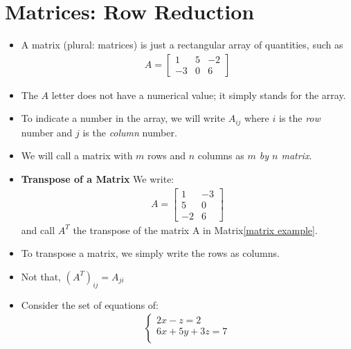         \section{Matrices: Row Reduction}
            \begin{itemize}
                \item A matrix (plural: matrices) is just a rectangular array of quantities, such as
                \begin{align} \label{matrix example}
                    A= \begin{bmatrix} 
                        1 & 5 & -2 \\
                        -3 & 0 & 6 
                    \end{bmatrix}
                \end{align}
                \item The $A$ letter does not have a numerical value; it simply stands for the array.
                \item To indicate a number in the array, we will write $A_{ij}$ where $i$ is the 
                \textit{row} number and $j$ is the \textit{column} number.
                \item We will call a matrix with $m$ rows and $n$ columns as \textit{$m$ by $n$ matrix}.
                \item \textbf{Transpose of a Matrix} We write:
                \begin{align} \label{transpose example}
                    A= \begin{bmatrix} 
                    1 & -3 \\ 
                    5 & 0 \\
                    -2 & 6
                    \end{bmatrix}
                \end{align}
                and call $A^T$ the transpose of the matrix A in Matrix\eqref{matrix example}.
                \item To transpose a matrix, we simply write the rows as columns.
                \item Not that, $(A^T)_{ij} = A_{ji}$
                \item Consider the set of equations of:
                \begin{align}\label{set of equations}
                    \begin{cases}
                        2x - z =2\\
                        6x + 5y + 3z = 7\\

\end{cases}
\end{align}
\end{itemize}
